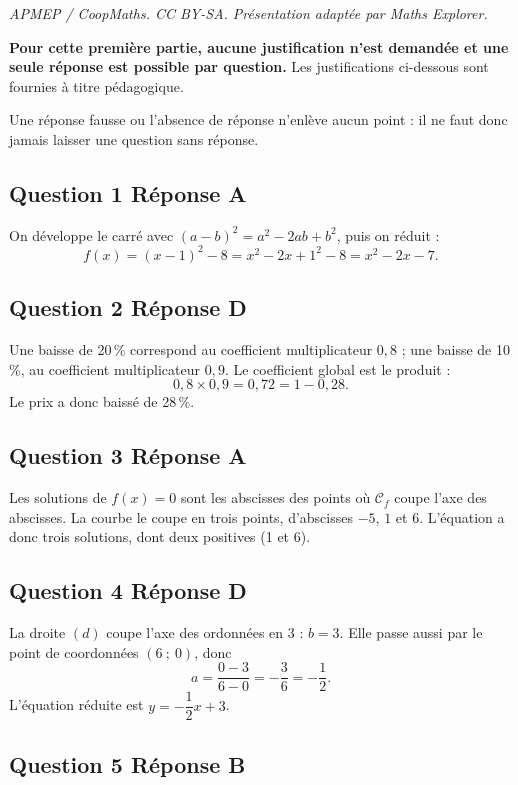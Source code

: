 \documentclass[10pt]{article}
\begin{document}
\noindent\textit{APMEP / CoopMaths. CC BY-SA. Présentation adaptée par Maths Explorer.}\par\medskip
\textbf{Pour cette première partie, aucune justification n'est demandée et une seule réponse est possible par question.} Les justifications ci-dessous sont fournies à titre pédagogique.

Une réponse fausse ou l'absence de réponse n'enlève aucun point : il ne faut donc jamais laisser une question sans réponse.

\subsection*{Question 1 \quad Réponse A}

On développe le carré avec $(a-b)^2 = a^2 - 2ab + b^2$, puis on réduit :
\[f(x) = (x-1)^2 - 8 = x^2 - 2x + 1^2 - 8 = x^2 - 2x - 7.\]

\subsection*{Question 2 \quad Réponse D}

Une baisse de 20\,\% correspond au coefficient multiplicateur $0,8$ ; une baisse de
10\,\%, au coefficient multiplicateur $0,9$. Le coefficient global est le produit :
\[0,8 \times 0,9 = 0,72 = 1 - 0,28.\]
Le prix a donc baissé de 28\,\%.

\subsection*{Question 3 \quad Réponse A}

Les solutions de $f(x) = 0$ sont les abscisses des points où $\mathcal{C}_f$ coupe l'axe des
abscisses. La courbe le coupe en trois points, d'abscisses $-5$, $1$ et $6$. L'équation a
donc trois solutions, dont deux positives (1 et 6).

\subsection*{Question 4 \quad Réponse D}

La droite $(d)$ coupe l'axe des ordonnées en 3 : $b = 3$. Elle passe aussi par le point
de coordonnées $(6~;~0)$, donc
\[a = \dfrac{0 - 3}{6 - 0} = -\dfrac{3}{6} = -\dfrac{1}{2}.\]
L'équation réduite est $y = -\dfrac{1}{2}x + 3$.

\subsection*{Question 5 \quad Réponse B}
\end{document}
